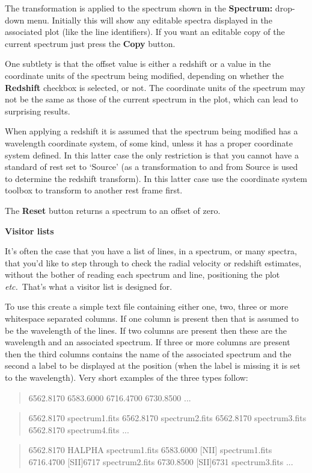 \documentclass[twoside,11pt,nolof]{starlink}
\newcommand{\labelitem}[1]{\textbf{#1}}
\providecommand{\etc}{\textit{etc.}}
\providecommand{\subheading}[1]{\textbf{\large{#1}}}
\begin{document}
The transformation is applied to the spectrum shown in the
\labelitem{Spectrum:} drop-down menu. Initially this will show any editable
spectra displayed in the associated plot (like the line identifiers).
If you want an editable copy of the current spectrum just press the
\labelitem{Copy} button.

One subtlety is that the offset value is either a redshift or a value in the
coordinate units of the spectrum being modified, depending on whether the
\labelitem{Redshift} checkbox is selected, or not. The coordinate units of
the spectrum may not be the same as those of the current spectrum in the plot,
which can lead to surprising results.

When applying a redshift it is assumed that the spectrum being modified has a
wavelength coordinate system, of some kind, unless it has a proper coordinate
system defined. In this latter case the only restriction is that you cannot
have a standard of rest set to `Source' (as a transformation to and from
Source is used to determine the redshift transform). In this latter case use
the coordinate system toolbox to transform to another rest frame first.

The \labelitem{Reset} button returns a spectrum to an offset of zero.

\subheading{Visitor lists}

It's often the case that you have a list of lines, in a spectrum, or many
spectra, that you'd like to step through to check the radial velocity or
redshift estimates, without the bother of reading each spectrum and line,
positioning the plot \etc\ That's what a visitor list is designed for.

To use this create a simple text file containing either one, two, three
or more whitespace separated columns. If one column is present then that is
assumed to be the wavelength of the lines. If two columns are present then
these are the wavelength and an associated spectrum. If three or more columns
are present then the third columns contains the name of the associated
spectrum and the second a label to be displayed at the position (when the
label is missing it is set to the wavelength). Very short examples of the
three types follow:

\begin{quote}
\begin{terminalv}
 6562.8170
 6583.6000
 6716.4700
 6730.8500
 ...
\end{terminalv}
\end{quote}
\begin{quote}
\begin{terminalv}
 6562.8170 spectrum1.fits
 6562.8170 spectrum2.fits
 6562.8170 spectrum3.fits
 6562.8170 spectrum4.fits
 ...
\end{terminalv}
\end{quote}
\begin{quote}
\begin{terminalv}
 6562.8170 HALPHA    spectrum1.fits
 6583.6000 [NII]     spectrum1.fits
 6716.4700 [SII]6717 spectrum2.fits
 6730.8500 [SII]6731 spectrum3.fits
 ...
\end{terminalv}
\end{quote}
\end{document}
